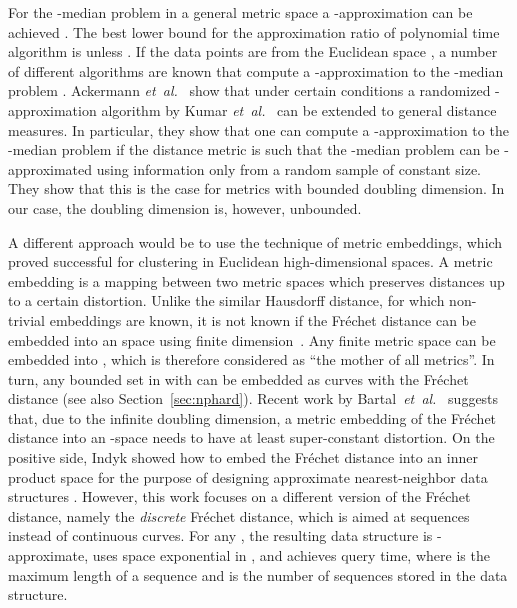 \documentclass[11pt, letter]{article}
\newcommand{\etal}{\textit{e{}t~a{}l.}\xspace}
\newcommand{\secref}[1]{Section~\ref{sec:#1}}
\newcommand{\Frechet}{Fr\'echet\xspace}
\begin{document}
For the -median problem in a general metric space a
-approximation can be achieved \cite{ls-akm-13}. The
best lower bound for the approximation ratio of polynomial time algorithm is
 unless  \cite{jain2002greedy}. If the data points are from the
Euclidean space , a number of different algorithms are known that compute
a -approximation to the -median problem 
\cite{c-kmc-09,FeldmanLangberg11, HarPeledKushal07, harpeledmazumdar2004, KR99, kumar2010lineartime}. 
Ackermann \etal~\cite{abs-cm-10}
show that under certain conditions a randomized -approximation algorithm by Kumar
\etal~\cite{kumar2010lineartime} can be extended to general distance measures. 
In particular, they show that one can compute a -approximation to 
the -median problem if the distance metric is such that the -median 
problem can be -approximated using information only from a random
sample of constant size. They show that this is the case for
metrics with bounded doubling dimension. In our case, the doubling dimension is,
however, unbounded.



A different approach would be to use the technique of metric
embeddings, which proved successful for clustering in Euclidean 
high-dimensional spaces. A metric embedding is a mapping between two metric
spaces which preserves distances up to a certain distortion.
Unlike the similar Hausdorff distance, for which non-trivial embeddings are
known, it is not known if the \Frechet distance can be embedded into
an  space using finite dimension~\cite{IndMat04}.
Any finite metric space can be embedded into
, which is therefore considered as ``the
mother of all metrics''. In turn, any bounded set in  with  
can be embedded as curves with the \Frechet distance (see also
\secref{nphard}).   Recent work by Bartal~\etal~\cite{bartal2014impossible}
suggests that, due to the infinite doubling dimension, a metric embedding of the
\Frechet distance into an -space needs to have at least super-constant
distortion.  On the positive side, Indyk showed how to embed the \Frechet
distance into an inner product space for the purpose of designing approximate
nearest-neighbor data structures \cite{i-approxnn-02}. 
However, this work focuses on a different version of the \Frechet distance,
namely the \emph{discrete} \Frechet distance, which is aimed at sequences
instead of continuous curves. For any , the resulting data structure is
-approximate, uses space exponential in
, and achieves  query time, where  is the maximum length of
a sequence and  is the number of sequences stored in the data structure. 
\end{document}
